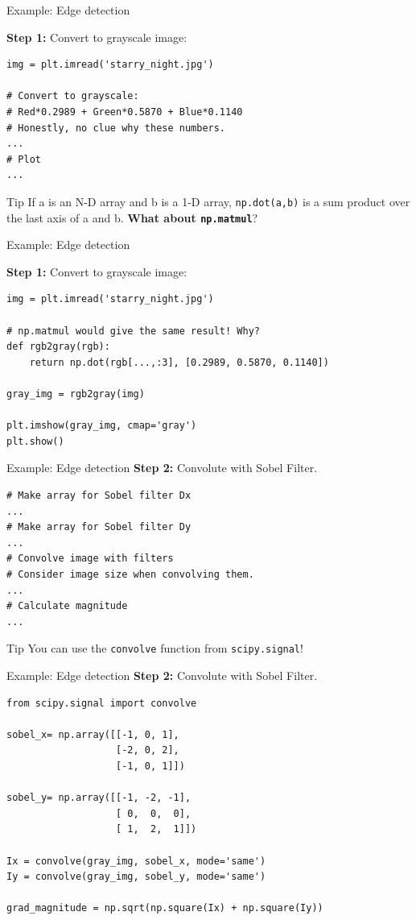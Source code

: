 \documentclass[compress%
,aspectratio=169%
]{beamer}
\newcommand{\code}{\lstinline}
\begin{document}
\begin{frame}[fragile]{Example: Edge detection}

\textbf{Step 1:} Convert to grayscale image:
\begin{lstlisting}
img = plt.imread('starry_night.jpg')

# Convert to grayscale:
# Red*0.2989 + Green*0.5870 + Blue*0.1140
# Honestly, no clue why these numbers.
...
# Plot
...
\end{lstlisting}
\begin{alertblock}{Tip}
If a is an N-D array and b is a 1-D array, \texttt{np.dot(a,b)} is a sum product over the last axis of a and b. \textbf{What about \texttt{np.matmul}}?\end{alertblock}
\end{frame}

\begin{frame}[fragile]{Example: Edge detection}

\textbf{Step 1:} Convert to grayscale image:
\begin{lstlisting}
img = plt.imread('starry_night.jpg')

# np.matmul would give the same result! Why?
def rgb2gray(rgb):
    return np.dot(rgb[...,:3], [0.2989, 0.5870, 0.1140])

gray_img = rgb2gray(img)

plt.imshow(gray_img, cmap='gray')
plt.show()
\end{lstlisting}
\end{frame}

\begin{frame}[fragile]{Example: Edge detection}
\textbf{Step 2:} Convolute with Sobel Filter.
\begin{lstlisting}
# Make array for Sobel filter Dx
...
# Make array for Sobel filter Dy
...
# Convolve image with filters
# Consider image size when convolving them.
...
# Calculate magnitude
...
\end{lstlisting}
\begin{alertblock}{Tip}
You can use the \code{convolve} function from \texttt{scipy.signal}!
\end{alertblock}
\end{frame}


\begin{frame}[fragile]{Example: Edge detection}
\textbf{Step 2:} Convolute with Sobel Filter.
\begin{lstlisting}
from scipy.signal import convolve

sobel_x= np.array([[-1, 0, 1], 
                   [-2, 0, 2],
                   [-1, 0, 1]])
                   
sobel_y= np.array([[-1, -2, -1], 
                   [ 0,  0,  0], 
                   [ 1,  2,  1]])

Ix = convolve(gray_img, sobel_x, mode='same')
Iy = convolve(gray_img, sobel_y, mode='same')

grad_magnitude = np.sqrt(np.square(Ix) + np.square(Iy))
\end{lstlisting}

\end{frame}
\end{document}
